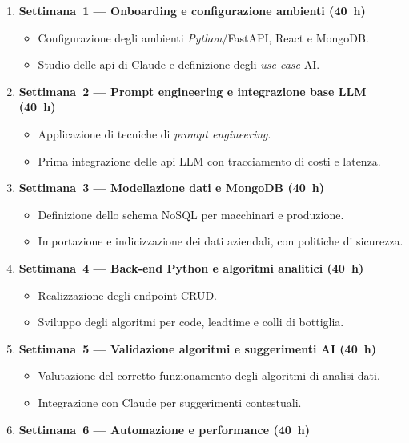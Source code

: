 \begin{enumerate}
    \item \textbf{Settimana~1 — Onboarding e configurazione ambienti (40~h)}
        \begin{itemize}
            \item Configurazione degli ambienti \textit{Python}/FastAPI, React e MongoDB.
            \item Studio delle \gls{api} di Claude e definizione degli \textit{use case} AI.
        \end{itemize}
    \item \textbf{Settimana~2 — Prompt engineering e integrazione base LLM (40~h)}
        \begin{itemize}
            \item Applicazione di tecniche di \textit{prompt engineering}.
            \item Prima integrazione delle \gls{api} LLM con tracciamento di costi e latenza.
        \end{itemize}
    \item \textbf{Settimana~3 — Modellazione dati e MongoDB (40~h)}
        \begin{itemize}
            \item Definizione dello schema NoSQL per macchinari e produzione.
            \item Importazione e indicizzazione dei dati aziendali, con politiche di sicurezza.
        \end{itemize}
    \item \textbf{Settimana~4 — Back‑end Python e algoritmi analitici (40~h)}
        \begin{itemize}
            \item Realizzazione degli endpoint CRUD.
            \item Sviluppo degli algoritmi per code, \gls{leadtime} e colli di bottiglia.
        \end{itemize}
    \item \textbf{Settimana~5 — Validazione algoritmi e suggerimenti AI (40~h)}
        \begin{itemize}
            \item Valutazione del corretto funzionamento degli algoritmi di analisi dati.
            \item Integrazione con Claude per suggerimenti contestuali.
        \end{itemize}
    \item \textbf{Settimana~6 — Automazione e performance (40~h)}

\end{enumerate}
